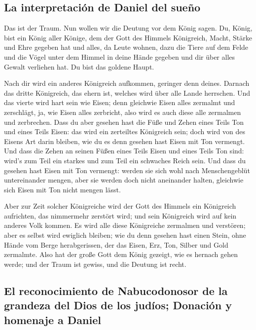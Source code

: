 \hypertarget{la-interpretaciuxf3n-de-daniel-del-sueuxf1o}{%
\subsection{La interpretación de Daniel del
sueño}\label{la-interpretaciuxf3n-de-daniel-del-sueuxf1o}}

 Das ist der Traum. Nun wollen wir die Deutung vor dem
König sagen.  Du, König, bist ein König aller Könige, dem
der Gott des Himmels Königreich, Macht, Stärke und Ehre gegeben hat
 und alles, da Leute wohnen, dazu die Tiere auf dem Felde
und die Vögel unter dem Himmel in deine Hände gegeben und dir über alles
Gewalt verliehen hat. Du bist das goldene Haupt.

 Nach dir wird ein anderes Königreich aufkommen, geringer
denn deines. Darnach das dritte Königreich, das ehern ist, welches wird
über alle Lande herrschen.  Und das vierte wird hart sein
wie Eisen; denn gleichwie Eisen alles zermalmt und zerschlägt, ja, wie
Eisen alles zerbricht, also wird es auch diese alle zermalmen und
zerbrechen.  Dass du aber gesehen hast die Füße und Zehen
eines Teils Ton und eines Teils Eisen: das wird ein zerteiltes
Königreich sein; doch wird von des Eisens Art darin bleiben, wie du es
denn gesehen hast Eisen mit Ton vermengt.  Und dass die
Zehen an seinen Füßen eines Teils Eisen und eines Teils Ton sind: wird's
zum Teil ein starkes und zum Teil ein schwaches Reich sein.
 Und dass du gesehen hast Eisen mit Ton vermengt: werden
sie sich wohl nach Menschengeblüt untereinander mengen, aber sie werden
doch nicht aneinander halten, gleichwie sich Eisen mit Ton nicht mengen
lässt.

 Aber zur Zeit solcher Königreiche wird der Gott des
Himmels ein Königreich aufrichten, das nimmermehr zerstört wird; und
sein Königreich wird auf kein anderes Volk kommen. Es wird alle diese
Königreiche zermalmen und verstören; aber es selbst wird ewiglich
bleiben;  wie du denn gesehen hast einen Stein, ohne
Hände vom Berge herabgerissen, der das Eisen, Erz, Ton, Silber und Gold
zermalmte. Also hat der große Gott dem König gezeigt, wie es hernach
gehen werde; und der Traum ist gewiss, und die Deutung ist recht.

\hypertarget{el-reconocimiento-de-nabucodonosor-de-la-grandeza-del-dios-de-los-juduxedos-donaciuxf3n-y-homenaje-a-daniel}{%
\subsection{El reconocimiento de Nabucodonosor de la grandeza del Dios
de los judíos; Donación y homenaje a
Daniel}\label{el-reconocimiento-de-nabucodonosor-de-la-grandeza-del-dios-de-los-juduxedos-donaciuxf3n-y-homenaje-a-daniel}}

